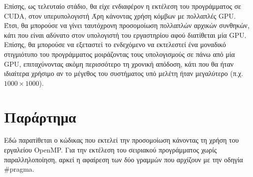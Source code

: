 \documentclass[12pt,a4paper]{article}
\begin{document}
Επίσης, ως τελευταίο στάδιο, θα είχε ενδιαφέρον η εκτέλεση του προγράμματος σε CUDA, στον υπερυπολογιστή Άρη κάνοντας χρήση κόμβων με πολλαπλές GPU. Έτσι, θα μπορούσε να γίνει ταυτόχρονη προσομοίωση πολλαπλών αρχικών συνθηκών, κάτι που είναι αδύνατο στον υπολογιστή του εργαστηρίου αφού διατίθεται μία GPU. Επίσης, θα μπορούσε να εξεταστεί το ενδεχόμενο να εκτελεστεί ένα μοναδικό στιγμιότυπο του προγράμματος μοιράζοντας τους υπολογισμούς σε πάνω από μία GPU, επιταχύνοντας ακόμη περισσότερο τη χρονική απόδοση, κάτι που θα ήταν ιδιαίτερα χρήσιμο αν το μέγεθος του συστήματος υπό μελέτη ήταν μεγαλύτερο (π.χ. $1000 \times 1000$).

\newpage



\newpage

\appendix
\section{Παράρτημα}

Εδώ παρατίθεται ο κώδικας που εκτελεί την προσομοίωση κάνοντας τη χρήση του εργαλείου OpenMP. Για την εκτέλεση του σειριακού προγράμματος χωρίς παραλληλοποίηση, αρκεί η αφαίρεση των δύο γραμμών που αρχίζουν με την οδηγία \#pragma.


\end{document}
